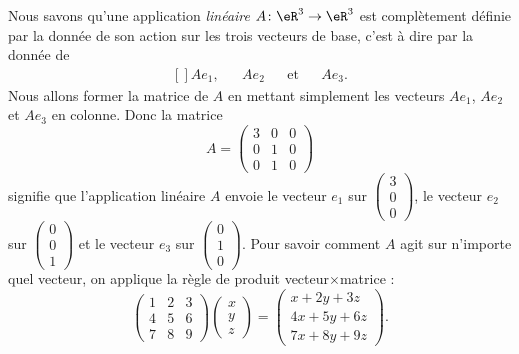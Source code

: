 Nous savons qu'une application \emph{linéaire} $A\colon \eR^3\to \eR^3$ est complètement définie par la donnée de son action sur les trois vecteurs de base, c'est à dire par la donnée de
\begin{equation}
	\begin{aligned}[]
		Ae_1,&&Ae_2&&\text{et}&&Ae_3.
	\end{aligned}
\end{equation}
Nous allons former la matrice de $A$ en mettant simplement les vecteurs $Ae_1$, $Ae_2$ et $Ae_3$ en colonne. Donc la matrice
\begin{equation}		\label{EqExempleALin}
	A=\begin{pmatrix}
		3	&	0	&	0	\\
		0	&	1	&	0	\\
		0	&	1	&	0
	\end{pmatrix}
\end{equation}
signifie que l'application linéaire $A$ envoie le vecteur $e_1$ sur $\begin{pmatrix}
	3	\\
	0	\\
	0
\end{pmatrix}$, le vecteur $e_2$ sur $\begin{pmatrix}
	0	\\
	0	\\
	1
\end{pmatrix}$ et le vecteur $e_3$ sur $\begin{pmatrix}
	0	\\
	1	\\
	0
\end{pmatrix}$.
Pour savoir comment $A$ agit sur n'importe quel vecteur, on applique la règle de produit vecteur$\times$matrice :
\begin{equation}
	\begin{pmatrix}
		1	&	2	&	3	\\
		4	&	5	&	6	\\
		7	&	8	&	9
	\end{pmatrix}\begin{pmatrix}
		x	\\
		y	\\
		z
	\end{pmatrix}=
	\begin{pmatrix}
		x+2y+3z	\\
		4x+5y+6z	\\
		7x+8y+9z
	\end{pmatrix}.
\end{equation}

